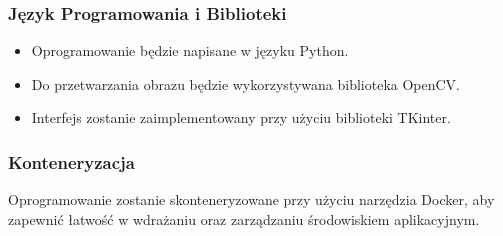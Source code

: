 \subsubsection*{Język Programowania i Biblioteki}
\begin{itemize}
    \item Oprogramowanie będzie napisane w języku Python.
    \item Do przetwarzania obrazu będzie wykorzystywana biblioteka OpenCV.
    \item Interfejs zostanie zaimplementowany przy użyciu biblioteki TKinter.
\end{itemize}

\subsubsection*{Konteneryzacja}
Oprogramowanie zostanie skonteneryzowane przy użyciu narzędzia Docker, 
aby zapewnić łatwość w wdrażaniu oraz zarządzaniu środowiskiem aplikacyjnym.